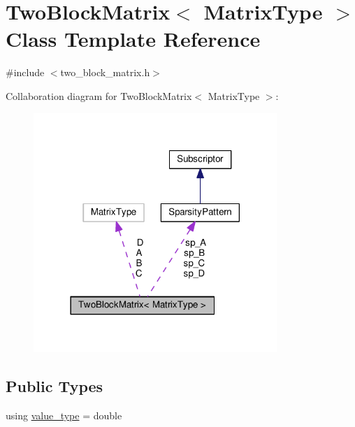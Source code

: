 \hypertarget{class_two_block_matrix}{}\section{Two\+Block\+Matrix$<$ Matrix\+Type $>$ Class Template Reference}
\label{class_two_block_matrix}


{\ttfamily \#include $<$two\+\_\+block\+\_\+matrix.\+h$>$}



Collaboration diagram for Two\+Block\+Matrix$<$ Matrix\+Type $>$\+:
\nopagebreak
\begin{figure}[H]
\begin{center}
\leavevmode
\includegraphics[width=261pt]{class_two_block_matrix__coll__graph}
\end{center}
\end{figure}
\subsection*{Public Types}
\begin{DoxyCompactItemize}
\item 
using \hyperlink{class_two_block_matrix_a9f50fb1f98df3ae0048c3c5220aa265f}{value\+\_\+type} = double
\end{DoxyCompactItemize}
